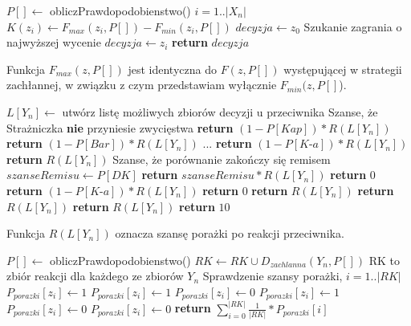 \begin{algorithmic}[1]
	\State $P[] \gets$ obliczPrawdopodobienstwo()
		 \Comment $i=1..|X_n|$
			\State $K(z_i) \gets F_{max}(z_i, P[]) - F_{min}(z_i, P[])$
		\EndFor		
		\State $ decyzja \gets z_0$ \Comment Szukanie zagrania o najwyższej wycenie
				\State $decyzja \gets z_i$
			\EndIf
		\EndFor		
		\State \textbf{return} $decyzja$
	\EndFunction
\end{algorithmic}

Funkcja $F_{max}(z, P[])$ jest identyczna do $F(z, P[])$ występującej w strategii zachłannej, w związku z czym przedstawiam wyłącznie $F_{min}(z, P[]$).
\begin{algorithmic}[1]
		\State $L[Y_n] \gets$ utwórz listę możliwych zbiorów decyzji u przeciwnika 
			 \Comment Szanse, że Strażniczka \textbf{nie} przyniesie zwycięstwa
				\State \textbf{return} $ (1 - P[Kap]) * R(L[Y_n]) $
			\EndCase
				\State \textbf{return} $ (1 - P[Bar]) * R(L[Y_n]) $
			\EndCase
				\State ...
				\State \textbf{return} $ (1 - P[\textit{K-a}]) * R(L[Y_n]) $
			\EndCase
				\State \textbf{return} $  R(L[Y_n]) $
			\EndCase
				\Comment Szanse, że porównanie zakończy się remisem 
				\State $ szanseRemisu \gets P[DK]$ 
				\State \textbf{return} $ szanseRemisu * R(L[Y_n]) $
			\EndCase
				\State \textbf{return} $ 0 $
			\EndCase
				\State \textbf{return} $ (1 - P[\textit{K-a}]) * R(L[Y_n]) $
			\EndCase
					\State \textbf{return} $ 0 $
				\Else
					\State \textbf{return} $ R(L[Y_n]) $
				\EndIf
			\EndCase
				\State \textbf{return} $ R(L[Y_n]) $
			\EndCase
				\State \textbf{return} $ R(L[Y_n]) $
			\EndCase
			\State \textbf{return} $ 10 $
			\EndCase
		\EndSwitch
	\EndFunction
\end{algorithmic}

Funkcja $R(L[Y_n])$ oznacza szansę porażki po reakcji przeciwnika.
\begin{algorithmic}[1]
			\State $P[] \gets$ obliczPrawdopodobienstwo()
			\State $RK \gets RK \cup D_{zachlanna}(Y_n, P[]) $	\Comment RK to zbiór reakcji dla każdego ze zbiorów $Y_n$
		\EndFor
			\Comment Sprawdzenie szansy porażki, $i=1..|RK|$
					\State $P_{porazki}[z_i] \gets 1$
				\EndCase
						\State $P_{porazki}[z_i] \gets 1$
					\Else
						\State $P_{porazki}[z_i] \gets 0$
					\EndIf
				\EndCase
						\State $P_{porazki}[z_i] \gets 1$
					\Else
						\State $P_{porazki}[z_i] \gets 0$
					\EndIf
				\EndCase
					$P_{porazki}[z_i] \gets 0$
				\EndCase
			\EndSwitch
		\EndFor
		\State \textbf{return} $ \sum_{i=0}^{|RK|} \frac{1}{|RK|} * P_{porazki}[i] $
	\EndFunction
\end{algorithmic}


